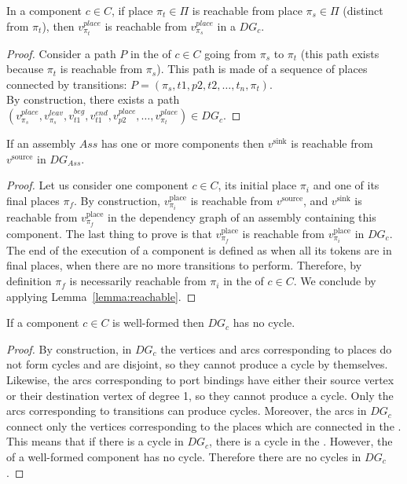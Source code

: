 \begin{lemma}
 In a component $c \in C$, if place $\pi_t \in \Pi$ is reachable from place
 $\pi_s \in \Pi$ (distinct from $\pi_t$), then $v_{\pi_t}^{place}$
 is reachable from $v_{\pi_s}^{place}$ in a $DG_c$.
 \label{lemma:reachable}
\end{lemma}

\begin{proof}
 Consider a path $P$ in the \net of $c \in C$ going from $\pi_s$ to
 $\pi_t$ (this path exists because $\pi_t$ is reachable from
 $\pi_s$). This path is made of a sequence of places connected by
 transitions: $P=(\pi_s,t1,p2,t2,\dots,t_n,\pi_t)$.\\
 By construction, there exists a path\\
 $(v_{\pi_s}^{place},v_{\pi_s}^{leav},v_{t1}^{beg},v_{t1}^{end},v_{p2}^{place},\dots,v_{\pi_t}^{place})
 \in DG_c$.
\end{proof}


\begin{lemma}
 If an assembly $Ass$ has one or more components then $v^\text{sink}$ is
 reachable from $v^\text{source}$ in $DG_{Ass}$.
 \label{lemma:source_sink}
\end{lemma}

\begin{proof}
 Let us consider one component $c \in C$, its initial place $\pi_i$ and one of
 its final places $\pi_f$. By construction, $v_{\pi_i}^\text{place}$ is
 reachable from $v^\text{source}$, and $v^\text{sink}$ is reachable from
 $v_{\pi_f}^\text{place}$ in the dependency graph of an assembly containing this
 component. The last thing to prove is that $v_{\pi_f}^\text{place}$ is reachable
 from $v_{\pi_i}^\text{place}$ in $DG_c$.
 The end of the execution of a \mad component is defined as
 when all its tokens are in final places, \ie when there are no more
 transitions to perform. Therefore, by definition $\pi_f$ is
 necessarily reachable from $\pi_i$ in the \net of $c \in C$.
 We conclude by applying Lemma~\ref{lemma:reachable}.
\end{proof}

\begin{lemma}
 If a component $c \in C$ is well-formed then $DG_c$ has no cycle.
 \label{lemma:no_cycles_component}
\end{lemma}

\begin{proof}
 By construction, in $DG_c$ the vertices and arcs corresponding to places do
 not form cycles and are disjoint, so they cannot produce a cycle by themselves.
 Likewise, the arcs corresponding to port bindings have either their source
 vertex or their destination vertex of degree 1, so they cannot produce a cycle.
 Only the arcs corresponding to transitions can produce cycles. Moreover, the
 arcs in $DG_c$ connect only the vertices corresponding to the places which
 are connected in the \net. This means that if there is a cycle in $DG_c$,
 there is a cycle in the \net. However, the \net of a well-formed \mad component
 has no cycle. Therefore there are no cycles in $DG_c$.
\end{proof}

